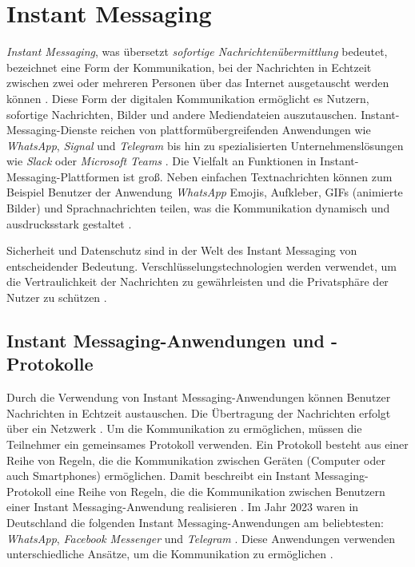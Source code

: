\section{Instant Messaging}
\label{sec:instant_messaging_basics}

\textit{Instant Messaging}, was übersetzt \textit{sofortige Nachrichtenübermittlung} bedeutet, bezeichnet eine Form der Kommunikation, bei der Nachrichten in Echtzeit zwischen zwei oder mehreren Personen über das Internet ausgetauscht werden können \Parencite[S. 69]{nist_mobileDeviceForensics}. Diese Form der digitalen Kommunikation ermöglicht es Nutzern, sofortige Nachrichten, Bilder und andere Mediendateien auszutauschen. Instant-Messaging-Dienste reichen von plattformübergreifenden Anwendungen wie \textit{WhatsApp}, \textit{Signal} und \textit{Telegram} bis hin zu spezialisierten Unternehmenslösungen wie \textit{Slack} oder \textit{Microsoft Teams} \parencite{Plett_IMDefinition}. Die Vielfalt an Funktionen in Instant-Messaging-Plattformen ist groß. Neben einfachen Textnachrichten können zum Beispiel Benutzer der Anwendung \textit{WhatsApp} Emojis, Aufkleber, GIFs (animierte Bilder) und Sprachnachrichten teilen, was die Kommunikation dynamisch und ausdrucksstark gestaltet \Parencite{whatsapp_funktionen}.

Sicherheit und Datenschutz sind in der Welt des Instant Messaging von entscheidender Bedeutung. Verschlüsselungstechnologien werden verwendet, um die Vertraulichkeit der Nachrichten zu gewährleisten und die Privatsphäre der Nutzer zu schützen \parencite[S. 13706]{Wang_IMSecurity}.


\subsection{Instant Messaging-Anwendungen und -Protokolle}
Durch die Verwendung von Instant Messaging-Anwendungen können Benutzer Nachrichten in Echtzeit austauschen. Die Übertragung der Nachrichten erfolgt über ein Netzwerk \Parencite[S. 69]{nist_mobileDeviceForensics}. Um die Kommunikation zu ermöglichen, müssen die Teilnehmer ein gemeinsames Protokoll verwenden. Ein Protokoll besteht aus einer Reihe von Regeln, die die Kommunikation zwischen Geräten (Computer oder auch Smartphones) ermöglichen. Damit beschreibt ein Instant Messaging-Protokoll eine Reihe von Regeln, die die Kommunikation zwischen Benutzern einer Instant Messaging-Anwendung realisieren \Parencite{Novalnet_Protokoll}. Im Jahr 2023 waren in Deutschland die folgenden Instant Messaging-Anwendungen am beliebtesten: \textit{WhatsApp}, \textit{Facebook Messenger} und \textit{Telegram} \parencite{Statista_MessengerNutzung}. Diese Anwendungen verwenden unterschiedliche Ansätze, um die Kommunikation zu ermöglichen \parencite[S. 103]{Luntovskyy_ModRechnernetze}. 


